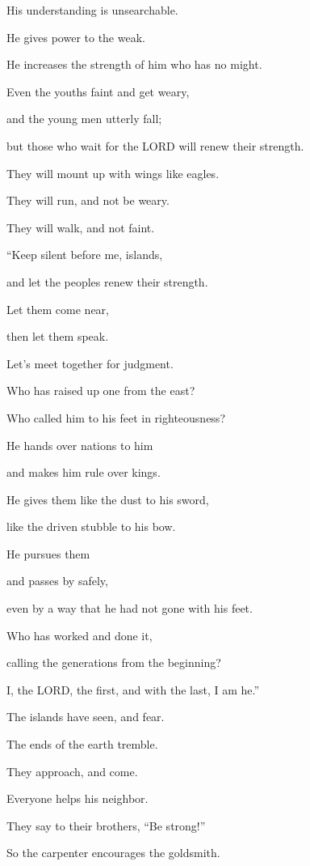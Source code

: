His understanding is unsearchable.

\myverse{}He gives power to the weak.

He increases the strength of him who has no might.

\myverse{}Even the youths faint and get weary,

and the young men utterly fall;

\myverse{}but those who wait for the LORD will renew their
strength.

They will mount up with wings like eagles.

They will run, and not be weary.

They will walk, and not faint.


\mychapter{} \myverse*{}“Keep silent before me, islands,

\quad\quad and let the peoples renew their strength.

Let them come near,

then let them speak.

Let’s meet together for judgment.

\myverse{}Who has raised up one from the east?

Who called him to his feet in righteousness?

He hands over nations to him

and makes him rule over kings.

He gives them like the dust to his sword,

like the driven stubble to his bow.

\myverse{}He pursues them

and passes by safely,

even by a way that he had not gone with his feet.

\myverse{}Who has worked and done it,

calling the generations from the beginning?

I, the LORD, the first, and with the last, I am he.”


\vspace{\baselineskip} \myverse{}The islands have seen, and fear.

The ends of the earth tremble.

They approach, and come.

\myverse{}Everyone helps his neighbor.

They say to their brothers, “Be strong!”

\myverse{}So the carpenter encourages the goldsmith.

